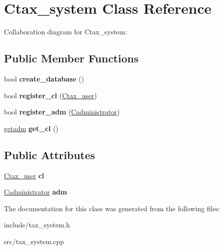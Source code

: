 \hypertarget{class_ctax__system}{\section{Ctax\+\_\+system Class Reference}
\label{class_ctax__system}
}


Collaboration diagram for Ctax\+\_\+system\+:
\subsection*{Public Member Functions}
\begin{DoxyCompactItemize}
\item 
\hypertarget{class_ctax__system_a81edc8b8d5774504a7fcd979804707cc}{bool {\bfseries create\+\_\+database} ()}\label{class_ctax__system_a81edc8b8d5774504a7fcd979804707cc}

\item 
\hypertarget{class_ctax__system_a7800ec2b95142757dd529b52accdd84c}{bool {\bfseries register\+\_\+cl} (\hyperlink{class_ctax__user}{Ctax\+\_\+user})}\label{class_ctax__system_a7800ec2b95142757dd529b52accdd84c}

\item 
\hypertarget{class_ctax__system_a50d8f1de16ae6c1cf77389df631196e2}{bool {\bfseries register\+\_\+adm} (\hyperlink{class_cadministrator}{Cadministrator})}\label{class_ctax__system_a50d8f1de16ae6c1cf77389df631196e2}

\item 
\hypertarget{class_ctax__system_ae2ab2de8b23b618b4d088a90619dba46}{\hyperlink{structgetadm}{getadm} {\bfseries get\+\_\+cl} ()}\label{class_ctax__system_ae2ab2de8b23b618b4d088a90619dba46}

\end{DoxyCompactItemize}
\subsection*{Public Attributes}
\begin{DoxyCompactItemize}
\item 
\hypertarget{class_ctax__system_a1dd3ab3c8df7a70a12ca4da2431846ab}{\hyperlink{class_ctax__user}{Ctax\+\_\+user} {\bfseries cl}}\label{class_ctax__system_a1dd3ab3c8df7a70a12ca4da2431846ab}

\item 
\hypertarget{class_ctax__system_a27056b4d003004aad0abbf33c894ee4c}{\hyperlink{class_cadministrator}{Cadministrator} {\bfseries adm}}\label{class_ctax__system_a27056b4d003004aad0abbf33c894ee4c}

\end{DoxyCompactItemize}


The documentation for this class was generated from the following files\+:\begin{DoxyCompactItemize}
\item 
include/tax\+\_\+system.\+h\item 
src/tax\+\_\+system.\+cpp\end{DoxyCompactItemize}

